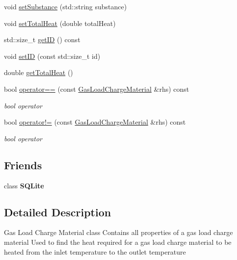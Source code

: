 \begin{DoxyCompactItemize}
void \hyperlink{class_gas_load_charge_material_a20cc3df601d8daae9b8f8e7b0c53c2e3}{set\+Substance} (std\+::string substance)
\item 
void \hyperlink{class_gas_load_charge_material_aae01f6f4f923965c111e1dac66eb8365}{set\+Total\+Heat} (double total\+Heat)
\item 
std\+::size\+\_\+t \hyperlink{class_gas_load_charge_material_a32dc0d73857ebe4322cf525064713cf6}{get\+ID} () const
\item 
void \hyperlink{class_gas_load_charge_material_a24b43ba7c871453258f458a8c1f15232}{set\+ID} (const std\+::size\+\_\+t id)
\item 
double \hyperlink{class_gas_load_charge_material_a4f831537652ca09c4539982c626cc164}{get\+Total\+Heat} ()
\item 
\mbox{\label{class_gas_load_charge_material_ac1d95bdf7d61d8ed98629aa17bf2c4b1}} 
bool \hyperlink{class_gas_load_charge_material_ac1d95bdf7d61d8ed98629aa17bf2c4b1}{operator==} (const \hyperlink{class_gas_load_charge_material}{Gas\+Load\+Charge\+Material} \&rhs) const
\begin{DoxyCompactList}\small\item\em bool operator \end{DoxyCompactList}\item 
\mbox{\label{class_gas_load_charge_material_ac6bc3f665a91fde01ebf6d1528cb7332}} 
bool \hyperlink{class_gas_load_charge_material_ac6bc3f665a91fde01ebf6d1528cb7332}{operator!=} (const \hyperlink{class_gas_load_charge_material}{Gas\+Load\+Charge\+Material} \&rhs) const
\begin{DoxyCompactList}\small\item\em bool operator \end{DoxyCompactList}\end{DoxyCompactItemize}
\subsection*{Friends}
\begin{DoxyCompactItemize}
\item 
\mbox{\label{class_gas_load_charge_material_ac7d22f3ca36435f73d55df60dc799e14}} 
class {\bfseries S\+Q\+Lite}
\end{DoxyCompactItemize}


\subsection{Detailed Description}
Gas Load Charge Material class Contains all properties of a gas load charge material Used to find the heat required for a gas load charge material to be heated from the inlet temperature to the outlet temperature 

